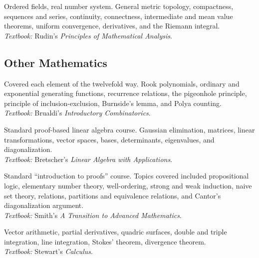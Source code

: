 \documentclass[11pt,letterpaper,sans]{moderncv}
\begin{document}
%
  {Ordered fields, real number system. General metric topology, compactness, sequences and series, continuity, connectness, intermediate and mean value theorems, uniform convergence, derivatives, and the Riemann integral. \\ \emph{Textbook: }Rudin's \emph{Principles of Mathematical Analysis}.}



\subsection{Other Mathematics}

%
  {Covered each element of the twelvefold way. Rook polynomials, ordinary and exponential generating functions, recurrence relations, the pigeonhole principle, principle of inclusion-exclusion, Burnside's lemma, and Polya counting.   \\ \emph{Textbook: }Brualdi's \emph{Introductory Combinatorics}.}

%
  {Standard proof-based linear algebra course. Gaussian elimination, matrices, linear transformations, vector spaces, bases, determinants, eigenvalues, and diagonalization.\\ \emph{Textbook: }Bretscher's \emph{Linear Algebra with Applications}.}

%
  {Standard ``introduction to proofs'' course. Topics covered included propositional logic, elementary number theory, well-ordering, strong and weak induction, naive set theory, relations, partitions and equivalence relations, and Cantor's diagonalization argument. \\ \emph{Textbook: }Smith's \emph{A Transition to Advanced Mathematics}.}

%
  {Vector arithmetic, partial derivatives, quadric surfaces, double and triple integration, line integration, Stokes' theorem, divergence theorem. \\ \emph{Textbook: }Stewart's \emph{Calculus}.}
\end{document}
